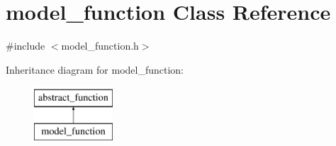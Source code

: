 \hypertarget{classmodel__function}{\section{model\-\_\-function Class Reference}
\label{classmodel__function}
}


{\ttfamily \#include $<$model\-\_\-function.\-h$>$}

Inheritance diagram for model\-\_\-function\-:\begin{figure}[H]
\begin{center}
\leavevmode
\includegraphics[height=2.000000cm]{classmodel__function}
\end{center}
\end{figure}
